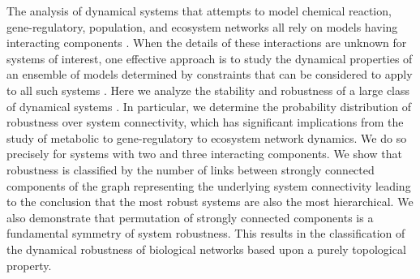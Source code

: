 The analysis of dynamical systems that attempts to model chemical reaction, gene-regulatory, population, and ecosystem networks all rely on models having interacting components \cite{RossCr2003,Alon2006,Palsson2006,HamidBolouri2008,Palsson2011a,Voit2012,Sauro2012}. When the details of these interactions are unknown for systems of interest, one effective approach is to study the dynamical properties of an ensemble of models determined by constraints that can be considered to apply to all such systems \cite{Gardner1970,May1972,Cohen1984,May1972a,Radius2014}. Here we analyze the stability and robustness of a large class of dynamical systems \cite{WADDINGTON1942a,Wagner1997,Rutherford1998,VanNimwegen1999,Siegal2002,Bergman2003,Ciliberti2007b,Ciliberti2007,Draghi2010,Wagner2013}. In particular, we determine the probability distribution of robustness over system connectivity, which has significant implications from the study of metabolic to gene-regulatory to ecosystem network dynamics. We do so precisely for systems with two and three interacting components. We show that robustness is classified by the number of links between strongly connected components of the graph representing the underlying system connectivity leading to the conclusion that the most robust systems are also the most hierarchical. We also demonstrate that permutation of strongly connected components is a fundamental symmetry of system robustness. This results in the classification of the dynamical robustness of biological networks based upon a purely topological property.
